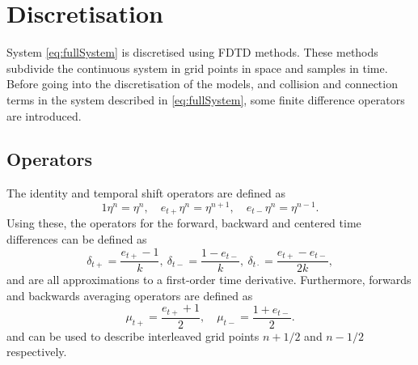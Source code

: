 \documentclass[dvipsnames, pdftex]{article}
\def\SBcomment[#1]{\textcolor{Red}{#1}}
\def\SWcomment[#1]{\textcolor{Bittersweet}{#1}}
\begin{document}

\section{Discretisation}\label{sec:disc}
System \eqref{eq:fullSystem} is discretised using FDTD methods. These methods subdivide the continuous system in grid points in space and samples %
in time. Before going into the discretisation of the models, and collision and connection terms in the system described in \eqref{eq:fullSystem}, some finite difference operators are introduced.

\subsection{Operators}
The identity and temporal shift operators are defined as
\begin{equation}
    1\eta^n = \eta^n, \quad e_{t+}\eta^n = \eta^{n+1}, \quad e_{t-}\eta^n = \eta^{n-1}.
\end{equation}
Using these, the operators for the forward, backward and centered time differences can be defined as
\begin{equation}\label{eq:discTimeOperators}
    \delta_{t+} = \frac{e_{t+} - 1}{k},\ \delta_{t-} = \frac{1 - e_{t-}}{k},\ \delta_{t\cdot} = \frac{e_{t+}-e_{t-}}{2k},
\end{equation}
and are all approximations to a first-order time derivative. Furthermore, forwards and backwards averaging operators are defined as
\begin{equation}
    \mu_{t+} = \frac{e_{t+} + 1}{2}, \quad \mu_{t-} = \frac{1 + e_{t-}}{2}.
\end{equation}
and can be used to describe interleaved grid points $n+1/2$ and $n-1/2$ respectively.
\end{document}
